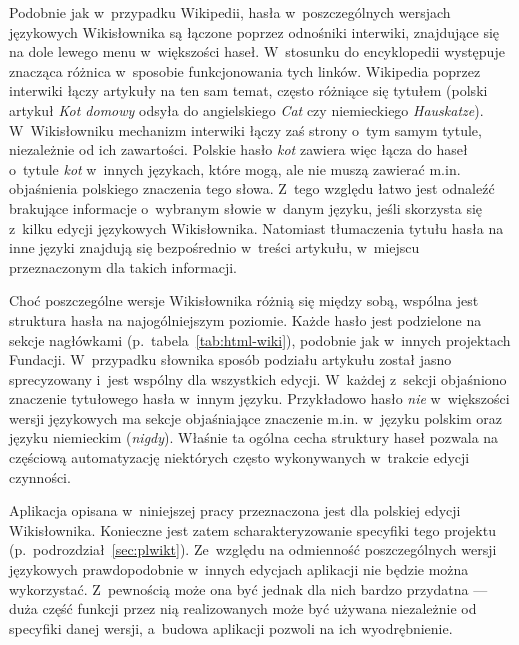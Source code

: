 Podobnie jak w~przypadku Wikipedii, hasła w~poszczególnych wersjach językowych Wikisłownika są łączone poprzez odnośniki interwiki, znajdujące się na dole lewego menu w~większości haseł. W~stosunku do encyklopedii występuje znacząca różnica w~sposobie funkcjonowania tych linków. Wikipedia poprzez interwiki łączy artykuły na ten sam temat, często różniące się tytułem (polski artykuł \emph{Kot domowy} odsyła do angielskiego \emph{Cat} czy niemieckiego \emph{Hauskatze}). W~Wikisłowniku mechanizm interwiki łączy zaś strony o~tym samym tytule, niezależnie od ich zawartości. Polskie hasło \emph{kot} zawiera więc łącza do haseł o~tytule \emph{kot} w~innych językach, które mogą, ale nie muszą zawierać m.in. objaśnienia polskiego znaczenia tego słowa. Z~tego względu łatwo jest odnaleźć brakujące informacje o~wybranym słowie w~danym języku, jeśli skorzysta się z~kilku edycji językowych Wikisłownika. Natomiast tłumaczenia tytułu hasła na inne języki znajdują się bezpośrednio w~treści artykułu, w~miejscu przeznaczonym dla takich informacji.

Choć poszczególne wersje Wikisłownika różnią się między sobą, wspólna jest struktura hasła na najogólniejszym poziomie. Każde hasło jest podzielone na sekcje nagłówkami (p.~tabela~\ref{tab:html-wiki}), podobnie jak w~innych projektach Fundacji. W~przypadku słownika sposób podziału artykułu został jasno sprecyzowany i~jest wspólny dla wszystkich edycji. W~każdej z~sekcji objaśniono znaczenie tytułowego hasła w~innym języku. Przykładowo hasło \emph{nie} w~większości wersji językowych ma sekcje objaśniające znaczenie m.in. w~języku polskim oraz języku niemieckim (\emph{nigdy}). Właśnie ta ogólna cecha struktury haseł pozwala na częściową automatyzację niektórych często wykonywanych w~trakcie edycji czynności.

Aplikacja opisana w~niniejszej pracy przeznaczona jest dla polskiej edycji Wikisłownika. Konieczne jest zatem scharakteryzowanie specyfiki tego projektu (p.~podrozdział~\ref{sec:plwikt}). Ze~względu na odmienność poszczególnych wersji językowych prawdopodobnie w~innych edycjach aplikacji nie będzie można wykorzystać. Z~pewnością może ona być jednak dla nich bardzo przydatna --- duża część funkcji przez nią realizowanych może być używana niezależnie od specyfiki danej wersji, a~budowa aplikacji pozwoli na ich wyodrębnienie.

